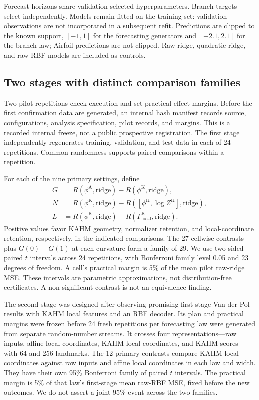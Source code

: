 \documentclass[10pt]{article}
\newcommand{\K}{\mathrm{K}}
\newcommand{\A}{\mathrm{A}}
\begin{document}
Forecast horizons share validation-selected hyperparameters. Branch targets
select independently. Models remain fitted on the training set: validation
observations are not incorporated in a subsequent refit. Predictions are
clipped to the known support, $[-1,1]$ for the forecasting generators and
$[-2.1,2.1]$ for the branch law; Airfoil predictions are not clipped. Raw
ridge, quadratic ridge, and raw RBF models are included as controls.

\subsection{Two stages with distinct comparison families}

Two pilot repetitions check execution and set practical effect margins.
Before the first confirmation data are generated, an internal hash manifest
records source, configurations, analysis specification, pilot records,
and margins. This is a recorded internal freeze, not a public prospective
registration. The first stage independently regenerates training,
validation, and test data in each of 24 repetitions. Common randomness
supports paired comparisons within a repetition.

For each of the nine primary settings, define
\begin{align}
 G&=R(\phi^{\A},\mathrm{ridge})-R(\phi^{\K},\mathrm{ridge}),\\
 N&=R(\phi^{\K},\mathrm{ridge})
                       -R([\phi^{\K},\log Z^{\K}],\mathrm{ridge}),\\
 L&=R(\phi^{\K},\mathrm{ridge})
                       -R(\Gamma_{\mathrm{local}}^{\K},\mathrm{ridge}).
\end{align}
Positive values favor KAHM geometry, normalizer retention, and local-coordinate
retention, respectively, in the indicated comparisons. The 27 cellwise
contrasts plus $G(0)-G(1)$ at each curvature form a family of 29. We use
two-sided paired $t$ intervals across 24 repetitions, with Bonferroni family
level 0.05 and 23 degrees of freedom. A cell's practical margin is 5\% of
the mean pilot raw-ridge MSE. These intervals are parametric approximations,
not distribution-free certificates. A non-significant contrast is not an
equivalence finding.

The second stage was designed after observing promising first-stage
Van der Pol results with KAHM local features and an RBF decoder. Its plan
and practical margins were frozen before 24 fresh repetitions per
forecasting law were generated from separate random-number streams.
It crosses four representations---raw inputs, affine local coordinates,
KAHM local coordinates, and KAHM scores---with 64 and 256 landmarks.
The 12 primary contrasts compare KAHM local coordinates against raw inputs
and affine local coordinates in each law and width. They have their own
95\% Bonferroni family of paired $t$ intervals. The practical margin is 5\%
of that law's first-stage mean raw-RBF MSE, fixed before the new outcomes.
We do not assert a joint 95\% event across the two families.
\end{document}
